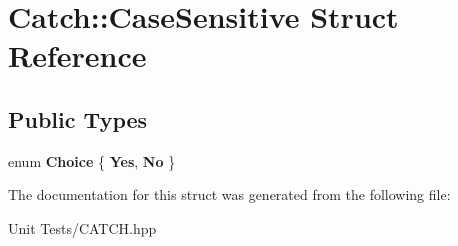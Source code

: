 \hypertarget{structCatch_1_1CaseSensitive}{}\section{Catch\+:\+:Case\+Sensitive Struct Reference}
\label{structCatch_1_1CaseSensitive}
\subsection*{Public Types}
\begin{DoxyCompactItemize}
\item 
enum {\bfseries Choice} \{ {\bfseries Yes}, 
{\bfseries No}
 \}\hypertarget{structCatch_1_1CaseSensitive_aad49d3aee2d97066642fffa919685c6a}{}\label{structCatch_1_1CaseSensitive_aad49d3aee2d97066642fffa919685c6a}

\end{DoxyCompactItemize}


The documentation for this struct was generated from the following file\+:\begin{DoxyCompactItemize}
\item 
Unit Tests/C\+A\+T\+C\+H.\+hpp\end{DoxyCompactItemize}
